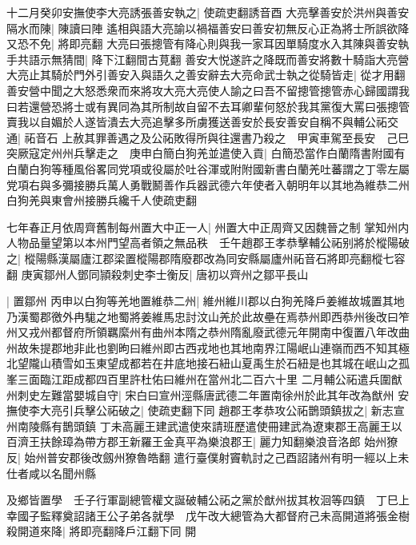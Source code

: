 十二月癸卯安撫使李大亮誘張善安執之|{
	使疏吏翻誘音酉}
大亮擊善安於洪州與善安隔水而陳|{
	陳讀曰陣}
遙相與語大亮諭以禍福善安曰善安初無反心正為將士所誤欲降又恐不免|{
	將即亮翻}
大亮曰張摠管有降心則與我一家耳因單騎度水入其陳與善安執手共語示無猜間|{
	降下江翻間古莧翻}
善安大悦遂許之降既而善安將數十騎詣大亮營大亮止其騎於門外引善安入與語久之善安辭去大亮命武士執之從騎皆走|{
	從才用翻}
善安營中聞之大怒悉衆而來將攻大亮大亮使人諭之曰吾不留摠管摠管赤心歸國謂我曰若還營恐將士或有異同為其所制故自留不去耳卿輩何怒於我其黨復大罵曰張摠管賣我以自媚於人遂皆潰去大亮追擊多所虜獲送善安於長安善安自稱不與輔公祏交通|{
	祏音石}
上赦其罪善遇之及公祏敗得所與往還書乃殺之　甲寅車駕至長安　己巳突厥寇定州州兵擊走之　庚申白簡白狗羌並遣使入貢|{
	白簡恐當作白蘭隋書附國有白蘭白狗等種風俗畧同党項或役屬於吐谷渾或附附國新書白蘭羌吐蕃謂之丁零左屬党項右與多彌接勝兵萬人勇戰鬭善作兵器武德六年使者入朝明年以其地為維恭二州白狗羌與東會州接勝兵纔千人使疏吏翻}


七年春正月依周齊舊制每州置大中正一人|{
	州置大中正周齊又因魏晉之制}
掌知州内人物品量望第以本州門望高者領之無品秩　壬午趙郡王孝恭擊輔公祏别將於樅陽破之|{
	樅陽縣漢屬廬江郡梁置樅陽郡隋廢郡改為同安縣屬廬州祏音石將即亮翻樅七容翻}
庚寅鄒州人鄧同頴殺刺史李士衡反|{
	唐初以齊州之鄒平長山}


|{
	置鄒州}
丙申以白狗等羌地置維恭二州|{
	維州維川郡以白狗羌降戶姜維故城置其地乃漢蜀郡徼外冉駹之地蜀將姜維馬忠討汶山羌於此故壘在焉恭州即西恭州後改曰笮州又戎州都督府所領羈縻州有曲州本隋之恭州隋亂廢武德元年開南中復置八年改曲州故朱提郡地非此也劉昫曰維州即古西戎地也其地南界江陽岷山連嶺而西不知其極北望隴山積雪如玉東望成都若在井底地接石紐山夏禹生於石紐是也其城在岷山之孤峯三面臨江距成都四百里許杜佑曰維州在當州北二百六十里}
二月輔公祏遣兵圍猷州刺史左難當嬰城自守|{
	宋白曰宣州涇縣唐武德二年置南徐州於此其年改為猷州}
安撫使李大亮引兵擊公祏破之|{
	使疏吏翻下同}
趙郡王孝恭攻公祏鵲頭鎮拔之|{
	新志宣州南陵縣有鵲頭鎮}
丁未高麗王建武遣使來請班歷遣使冊建武為遼東郡王高麗王以百濟王扶餘璋為帶方郡王新羅王金真平為樂浪郡王|{
	麗力知翻樂浪音洛郎}
始州獠反|{
	始州普安郡後改劔州獠魯皓翻}
遣行臺僕射竇軌討之己酉詔諸州有明一經以上未仕者咸以名聞州縣

及鄉皆置學　壬子行軍副總管權文誕破輔公祏之黨於猷州拔其枚洄等四鎮　丁巳上幸國子監釋奠詔諸王公子弟各就學　戊午改大總管為大都督府己未高開道將張金樹殺開道來降|{
	將即亮翻降戶江翻下同}
開

